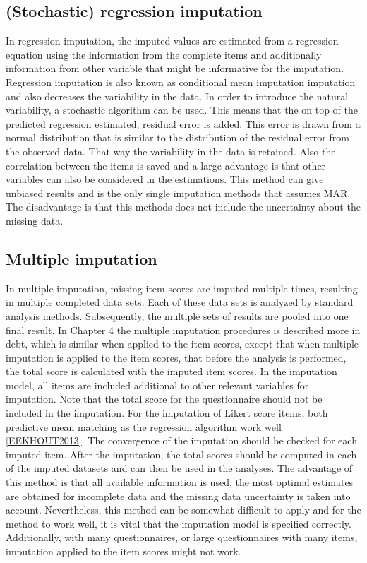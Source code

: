 \documentclass[]{book}
\begin{document}
\subsection{(Stochastic) regression
imputation}\label{stochastic-regression-imputation-1}

In regression imputation, the imputed values are estimated from a
regression equation using the information from the complete items and
additionally information from other variable that might be informative
for the imputation. Regression imputation is also known as conditional
mean imputation imputation and also decreases the variability in the
data. In order to introduce the natural variability, a stochastic
algorithm can be used. This means that the on top of the predicted
regression estimated, residual error is added. This error is drawn from
a normal distribution that is similar to the distribution of the
residual error from the observed data. That way the variability in the
data is retained. Also the correlation between the items is saved and a
large advantage is that other variables can also be considered in the
estimations. This method can give unbiased results and is the only
single imputation methods that assumes MAR. The disadvantage is that
this methods does not include the uncertainty about the missing data.

\subsection{Multiple imputation}\label{multiple-imputation-1}

In multiple imputation, missing item scores are imputed multiple times,
resulting in multiple completed data sets. Each of these data sets is
analyzed by standard analysis methods. Subsequently, the multiple sets
of results are pooled into one final result. In Chapter 4 the multiple
imputation procedures is described more in debt, which is similar when
applied to the item scores, except that when multiple imputation is
applied to the item scores, that before the analysis is performed, the
total score is calculated with the imputed item scores. In the
imputation model, all items are included additional to other relevant
variables for imputation. Note that the total score for the
questionnaire should not be included in the imputation. For the
imputation of Likert score items, both predictive mean matching as the
regression algorithm work well \ref{EEKHOUT2013}. The convergence of the
imputation should be checked for each imputed item. After the
imputation, the total scores should be computed in each of the imputed
datasets and can then be used in the analyses. The advantage of this
method is that all available information is used, the most optimal
estimates are obtained for incomplete data and the missing data
uncertainty is taken into account. Nevertheless, this method can be
somewhat difficult to apply and for the method to work well, it is vital
that the imputation model is specified correctly. Additionally, with
many questionnaires, or large questionnaires with many items, imputation
applied to the item scores might not work.
\end{document}
